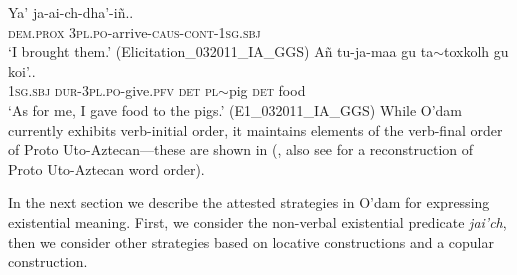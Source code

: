 \documentclass[output=paper,draft,draftmode,colorlinks,citecolor=brown]{langscibook}
\begin{document}
\ea
\label{ex:odam-trans}
\gll Ya’ 	ja-ai-ch-dha’-iñ..\\
\textsc{dem.prox} 	\textsc{3pl.po}-arrive-\textsc{caus-cont-1sg.sbj}\\
\glt ‘I brought them.’ (Elicitation\_032011\_IA\_GGS)
\z 
\ea
\label{ex:odam-ditrans}
\gll Añ 		tu-ja-maa 			gu 	ta$\sim$toxkolh 	gu 	koi’..\\
\textsc{1sg.sbj} 	\textsc{dur-3pl.po}-give.\textsc{pfv} 	\textsc{det}	\textsc{pl}$\sim$pig 	\textsc{det} 	food\\
\glt ‘As for me, I gave food to the pigs.’ (E1\_032011\_IA\_GGS)
\z 
While O’dam currently exhibits verb-initial order, it maintains elements of the verb-final order of Proto Uto-Aztecan---these are shown in  (\citealt{garcia2014,garciar2015}, also see \citealt[24--26]{langacker1977}  for a reconstruction of Proto Uto-Aztecan word order).

\begin{table}
\caption{O’dam features with respect to order of constituents (\citeauthor{garcia2014} 2014, \citeauthor{garciar2015} 2015)}
\label{tab:odam-odamfeat}
\end{table}

In the next section we describe the attested strategies in O’dam for expressing existential meaning. First, we consider the non-verbal existential predicate \emph{jai’ch}, then we consider other strategies based on locative constructions and a copular construction.
\end{document}

